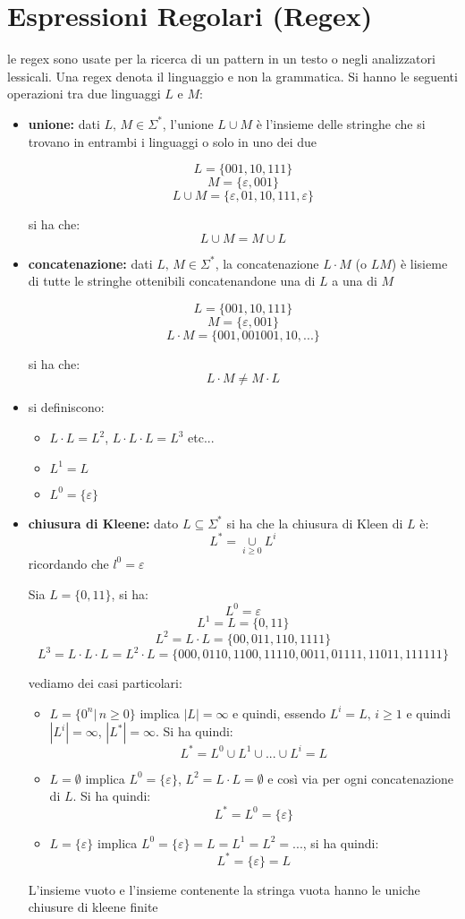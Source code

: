 \section{Espressioni Regolari (Regex)}
le regex sono usate per la ricerca di un pattern in un testo o negli analizzatori lessicali. Una regex denota il linguaggio e non la grammatica. Si hanno le seguenti operazioni tra due linguaggi $L$ e $M$:
\begin{itemize}
	\item \textbf{unione:} dati $L,\, M\in \Sigma^*$, l'unione $L\cup M$ è l'insieme delle stringhe che si trovano in entrambi i linguaggi o solo in uno dei due
				\begin{example}
					$$L=\{001,10,111\}$$
					$$M=\{\varepsilon,001\}$$
					$$L\cup M=\{\varepsilon,01,10,111,\varepsilon\}$$
				\end{example}
				si ha che:
				$$L\cup M=M\cup L$$
	\item \textbf{concatenazione:} dati $L,\, M\in \Sigma^*$, la concatenazione $L\cdot M$ (o $LM$) è lisieme di tutte le stringhe ottenibili concatenandone una di $L$ a una di $M$
				\begin{example}
					$$L=\{001,10,111\}$$
					$$M=\{\varepsilon,001\}$$
					$$L\cdot M=\{001,001001,10,...\}$$
				\end{example}
				si ha che:
				$$L\cdot M\neq M\cdot L$$
	\item si definiscono:
				\begin{itemize}
					\item $L\cdot L=L^2$, $L\cdot L\cdot L=L^3$ etc...
					\item $L^1=L$
					\item $L^0=\{\varepsilon\}$
				\end{itemize}
	\item \textbf{chiusura di Kleene:} dato $L\subseteq \Sigma^*$ si ha che la chiusura di Kleen di $L$ è:
				$$L^*=\underset{i\geq 0}{\cup}L^i$$
				ricordando che $l^0=\varepsilon$
				\begin{example}
					Sia $L=\{0,11\}$, si ha:
					$$L^0=\varepsilon$$
					$$L^1=L=\{0,11\}$$
					$$L^2=L\cdot L=\{00,011,110,1111\}$$
					$$L^3=L\cdot L\cdot L=L^2\cdot L=\{000,0110,1100,11110,0011,01111,11011,111111\}$$
				\end{example}
				vediamo dei casi particolari:
				\begin{itemize}
					\item $L=\{0^n|\,n\geq 0\}$ implica $|L|=\infty$ e quindi, essendo $L^i=L,\, i\geq 1$ e quindi $|L^i|=\infty$, $|L^*|=\infty$. Si ha quindi:
								$$L^*=L^0\cup L^1\cup ... \cup L^i=L$$
					\item $L=\emptyset$ implica $L^0=\{\varepsilon\}$, $L^2=L\cdot L=\emptyset$ e così via per ogni concatenazione di $L$. Si ha quindi:
								$$L^*=L^0=\{\varepsilon\}$$
					\item $L=\{\varepsilon\}$ implica $L^0=\{\varepsilon\}=L=L^1=L^2=...$, si ha quindi:
								$$L^*=\{\varepsilon\}=L$$
				\end{itemize}
				L'insieme vuoto e l'insieme contenente la stringa vuota hanno le uniche chiusure di kleene finite
\end{itemize}
